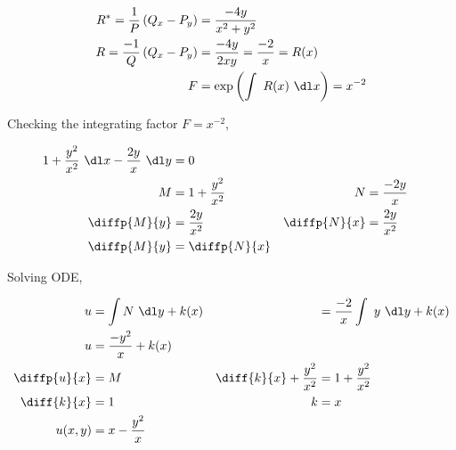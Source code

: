 \begin{enumerate}
          \begin{align}
              R^{*} = \frac{1}{P} \left( Q_{x} - P_{y} \right) & = \frac{-4y}{x^{2} + y^{2}}                      \\
              R = \frac{-1}{Q}\left( Q_{x} - P_{y} \right)     & = \frac{-4y}{2xy} = \frac{-2}{x}  = R(x)         \\
              F                                                & = \exp \left( \int\ R(x)\ \dl x \right) = x^{-2}
          \end{align}

          Checking the integrating factor $ F = x^{-2} $,

          \begin{align}
              1 + \frac{y^{2}}{x^{2}}\ \dl x - \frac{2y}{x}\ \dl y & = 0                                                           \\
              M                                                    & = 1 + \frac{y^{2}}{x^{2}} & N            & = \frac{-2y}{x}    \\
              \diffp{M}{y}                                         & = \frac{2y}{x^{2}}        & \diffp{N}{x} & = \frac{2y}{x^{2}} \\
              \diffp{M}{y}                                         & = \diffp{N}{x}
          \end{align}

          Solving ODE,

          \begin{align}
              u            & = \int N\ \dl y+ k(x)     &                                   & = \frac{-2}{x} \int\ y\ \dl y+ k(x) \\
              u            & = \frac{-y^{2}}{x} + k(x)                                                                           \\
              \diffp{u}{x} & = M                       & \diff{k}{x} + \frac{y^{2}}{x^{2}} & =  1 + \frac{y^{2}}{x^{2}}          \\
              \diff{k}{x}  & = 1                       & k                                 & = x                                 \\
              u(x, y)      & = x - \frac{y^{2}}{x}
          \end{align}



\end{enumerate}
